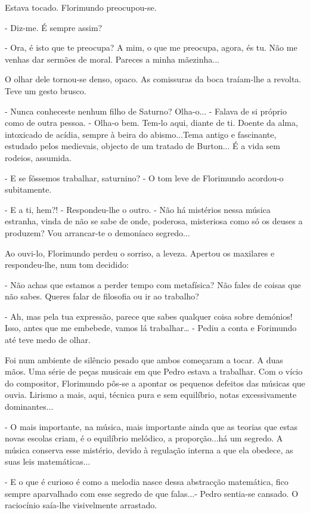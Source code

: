 Estava tocado. Florimundo preocupou-se.

- Diz-me. É sempre assim?

- Ora, é isto que te preocupa? A mim, o que me preocupa, agora, és tu.
Não me venhas dar sermões de moral. Pareces a minha mãezinha...

O olhar dele tornou-se denso, opaco. As comissuras da boca traíam-lhe a
revolta. Teve um gesto brusco.

- Nunca conheceste nenhum filho de Saturno? Olha-o... - Falava de si
próprio como de outra pessoa. - Olha-o bem. Tem-lo aqui, diante de ti.
Doente da alma, intoxicado de acídia, sempre à beira do abismo...Tema
antigo e fascinante, estudado pelos medievais, objecto de um tratado de
Burton... É a vida sem rodeios, assumida.

- E se fôssemos trabalhar, saturnino? - O tom leve de Florimundo
acordou-o subitamente.

- E a ti, hem?! - Respondeu-lhe o outro. - Não há mistérios nessa música
estranha, vinda de não se sabe de onde, poderosa, misteriosa como só os
deuses a produzem? Vou arrancar-te o demoníaco segredo...

Ao ouvi-lo, Florimundo perdeu o sorriso, a leveza. Apertou os maxilares
e respondeu-lhe, num tom decidido:

- Não achas que estamos a perder tempo com metafísica? Não fales de
coisas que não sabes. Queres falar de filosofia ou ir ao trabalho?

- Ah, mas pela tua expressão, parece que sabes qualquer coisa sobre
demónios! Isso, antes que me embebede, vamos lá trabalhar\ldots{} -
Pediu a conta e Forimundo até teve medo de olhar.

Foi num ambiente de silêncio pesado que ambos começaram a tocar. A duas
mãos. Uma série de peças musicais em que Pedro estava a trabalhar. Com o
vício do compositor, Florimundo pôs-se a apontar os pequenos defeitos
das músicas que ouvia. Lirismo a mais, aqui, técnica pura e sem
equilíbrio, notas excessivamente dominantes...

- O mais importante, na música, mais importante ainda que as teorias que
estas novas escolas criam, é o equilíbrio melódico, a proporção...há um
segredo. A música conserva esse mistério, devido à regulação interna a
que ela obedece, as suas leis matemáticas...

- E o que é curioso é como a melodia nasce dessa abstracção matemática,
fico sempre aparvalhado com esse segredo de que falas...- Pedro
sentia-se cansado. O raciocínio saía-lhe visivelmente arrastado.

